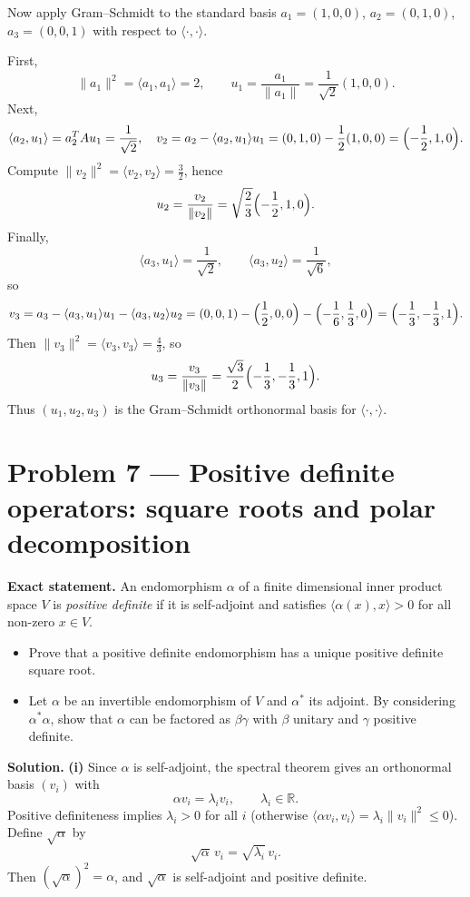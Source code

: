 \documentclass[12pt,a4paper]{article}
\theoremstyle{plain}
\theoremstyle{definition}      %
\begin{document}
Now apply Gram--Schmidt to the standard basis $a_1=(1,0,0)$, $a_2=(0,1,0)$, $a_3=(0,0,1)$ with respect to $\langle\cdot,\cdot\rangle$.

First,
\[
\|a_1\|^2=\langle a_1,a_1\rangle=2,\qquad
u_1=\frac{a_1}{\|a_1\|}=\frac1{\sqrt2}(1,0,0).
\]
Next,
\[
\langle a_2,u_1\rangle = a_2^TAu_1=\frac1{\sqrt2},
\quad
v_2=a_2-\langle a_2,u_1\rangle u_1=(0,1,0)-\frac12(1,0,0)=\Bigl(-\frac12,1,0\Bigr).
\]
Compute $\|v_2\|^2=\langle v_2,v_2\rangle=\frac32$, hence
\[
u_2=\frac{v_2}{\|v_2\|}=\sqrt{\frac23}\Bigl(-\frac12,1,0\Bigr).
\]
Finally,
\[
\langle a_3,u_1\rangle=\frac1{\sqrt2},\qquad
\langle a_3,u_2\rangle=\frac1{\sqrt6},
\]
so
\[
v_3=a_3-\langle a_3,u_1\rangle u_1-\langle a_3,u_2\rangle u_2
=(0,0,1)-\Bigl(\frac12,0,0\Bigr)-\Bigl(-\frac16,\frac13,0\Bigr)=\Bigl(-\frac13,-\frac13,1\Bigr).
\]
Then $\|v_3\|^2=\langle v_3,v_3\rangle=\frac43$, so
\[
u_3=\frac{v_3}{\|v_3\|}=\frac{\sqrt3}{2}\Bigl(-\frac13,-\frac13,1\Bigr).
\]
Thus $(u_1,u_2,u_3)$ is the Gram--Schmidt orthonormal basis for $\langle\cdot,\cdot\rangle$.


\section{Problem 7 — Positive definite operators: square roots and polar decomposition}

\textbf{Exact statement.}
An endomorphism $\alpha$ of a finite dimensional inner product space $V$ is \emph{positive definite} if it is self-adjoint and satisfies
$\langle \alpha(x),x\rangle>0$ for all non-zero $x\in V$.
\begin{itemize}
	\item[(i)] Prove that a positive definite endomorphism has a unique positive definite square root.
	\item[(ii)] Let $\alpha$ be an invertible endomorphism of $V$ and $\alpha^*$ its adjoint. By considering $\alpha^*\alpha$, show that $\alpha$
	can be factored as $\beta\gamma$ with $\beta$ unitary and $\gamma$ positive definite.
\end{itemize}

\textbf{Solution.}
\textbf{(i)} Since $\alpha$ is self-adjoint, the spectral theorem gives an orthonormal basis $(v_i)$ with
\[
\alpha v_i=\lambda_i v_i,\qquad \lambda_i\in\mathbb R.
\]
Positive definiteness implies $\lambda_i>0$ for all $i$ (otherwise $\langle \alpha v_i,v_i\rangle=\lambda_i\|v_i\|^2\le 0$).
Define $\sqrt{\alpha}$ by
\[
\sqrt{\alpha}\,v_i=\sqrt{\lambda_i}\,v_i.
\]
Then $(\sqrt{\alpha})^2=\alpha$, and $\sqrt{\alpha}$ is self-adjoint and positive definite.
\end{document}
